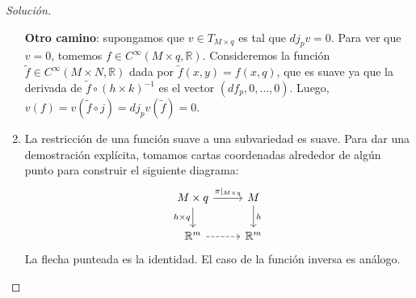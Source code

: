 \documentclass[spanish]{book}
\theoremstyle{definition}
\newcommand{\R}{\mathbb{R}}
\newcommand{\Cinf}{C^\infty}
\begin{document}
\begin{proof}[Solución]
\begin{enumerate}
		\textbf{Otro camino}: supongamos que $v\in T_{M\times q}$ es tal que $dj_pv=0$. Para ver que $v=0$, tomemos $f\in\Cinf(M\times q,\R)$. Consideremos la función $\tilde{f}\in\Cinf(M\times N,\R)$ dada por $\tilde{f}(x,y)=f(x,q)$, que es suave ya que la derivada de $\tilde{f}\circ(h\times k)^{-1}$ es el vector $(df_p,0,\ldots,0)$. Luego, $v(f)=v(\tilde{f}\circ j)=dj_pv(\tilde{f})=0$.
		\item La restricción de una función suave a una subvariedad es suave. Para dar una demostración explícita, tomamos cartas coordenadas alrededor de algún punto para construir el siguiente diagrama:
		\[\begin{tikzcd}
			M\times q\arrow{r}{\pi|_{M\times q}}\arrow[swap]{d}{h\times q}&M\arrow{d}{h}\\
			\R^m\arrow[dashed]{r}&\R^m
		\end{tikzcd}\]
		La flecha punteada es la identidad. El caso de la función inversa es análogo.
	\end{enumerate}
\end{proof}
\end{document}
